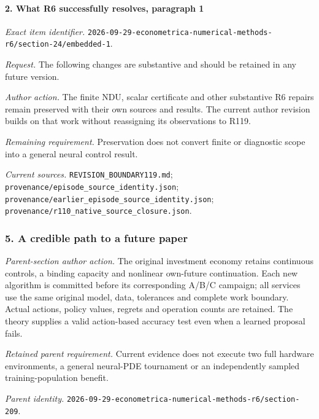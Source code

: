 \paragraph{2. What R6 successfully resolves, paragraph 1}

\emph{Exact item identifier.} \nolinkurl{2026-09-29-econometrica-numerical-methods-r6/section-24/embedded-1}.

\par\emph{Request.} The following changes are substantive and should be retained in any future version.

\par\emph{Author action.} The finite NDU, scalar certificate and other substantive R6 repairs remain preserved with their own sources and results. The current author revision builds on that work without reassigning its observations to R119.

\par\emph{Remaining requirement.} Preservation does not convert finite or diagnostic scope into a general neural control result.

\par\emph{Current sources.} \nolinkurl{REVISION_BOUNDARY119.md}; \nolinkurl{provenance/episode_source_identity.json}; \nolinkurl{provenance/earlier_episode_source_identity.json}; \nolinkurl{provenance/r110_native_source_closure.json}.

\subsubsection{5. A credible path to a future paper}

\emph{Parent-section author action.} The original investment economy retains continuous controls, a binding capacity and nonlinear own-future continuation. Each new algorithm is committed before its corresponding A/\allowbreak{}B/\allowbreak{}C campaign; all services use the same original model, data, tolerances and complete work boundary. Actual actions, policy values, regrets and operation counts are retained. The theory supplies a valid action-based accuracy test even when a learned proposal fails.

\par\emph{Retained parent requirement.} Current evidence does not execute two full hardware environments, a general neural-PDE tournament or an independently sampled training-population benefit.

\par\emph{Parent identity.} \nolinkurl{2026-09-29-econometrica-numerical-methods-r6/section-209}.

